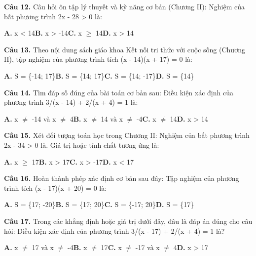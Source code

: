 \documentclass[11pt,a4paper]{article}
\begin{document}
\textbf{\color{primary} Câu 12.} Câu hỏi ôn tập lý thuyết và kỹ năng cơ bản (Chương II): Nghiệm của bất phương trình 2x - 28 > 0 là:\par
\hspace*{1.5em}\textbf{A.} x < 14\quad\quad \textbf{B.} x > -14\quad\quad \textbf{C.} x $\ge$ 14\quad\quad \textbf{D.} x > 14\par\vspace{2pt}
\textbf{\color{primary} Câu 13.} Theo nội dung sách giáo khoa Kết nối tri thức với cuộc sống (Chương II), tập nghiệm của phương trình tích (x - 14)(x + 17) = 0 là:\par
\hspace*{1.5em}\textbf{A.} S = \{-14; 17\}\quad\quad \textbf{B.} S = \{14; 17\}\quad\quad \textbf{C.} S = \{14; -17\}\quad\quad \textbf{D.} S = \{14\}\par\vspace{2pt}
\textbf{\color{primary} Câu 14.} Tìm đáp số đúng của bài toán cơ bản sau: Điều kiện xác định của phương trình 3/(x - 14) + 2/(x + 4) = 1 là:\par
\hspace*{1.5em}\textbf{A.} x $\ne$ -14 và x $\ne$ 4\quad\quad \textbf{B.} x $\ne$ 14 và x $\ne$ -4\quad\quad \textbf{C.} x $\ne$ 14\quad\quad \textbf{D.} x > 14\par\vspace{2pt}
\textbf{\color{primary} Câu 15.} Xét đối tượng toán học trong Chương II: Nghiệm của bất phương trình 2x - 34 > 0 là. Giá trị hoặc tính chất tương ứng là:\par
\hspace*{1.5em}\textbf{A.} x $\ge$ 17\quad\quad \textbf{B.} x > 17\quad\quad \textbf{C.} x > -17\quad\quad \textbf{D.} x < 17\par\vspace{2pt}
\textbf{\color{primary} Câu 16.} Hoàn thành phép xác định cơ bản sau đây: Tập nghiệm của phương trình tích (x - 17)(x + 20) = 0 là:\par
\hspace*{1.5em}\textbf{A.} S = \{17; -20\}\quad\quad \textbf{B.} S = \{17; 20\}\quad\quad \textbf{C.} S = \{-17; 20\}\quad\quad \textbf{D.} S = \{17\}\par\vspace{2pt}
\textbf{\color{primary} Câu 17.} Trong các khẳng định hoặc giá trị dưới đây, đâu là đáp án đúng cho câu hỏi: Điều kiện xác định của phương trình 3/(x - 17) + 2/(x + 4) = 1 là?\par
\hspace*{1.5em}\textbf{A.} x $\ne$ 17 và x $\ne$ -4\quad\quad \textbf{B.} x $\ne$ 17\quad\quad \textbf{C.} x $\ne$ -17 và x $\ne$ 4\quad\quad \textbf{D.} x > 17\par\vspace{2pt}
\end{document}
